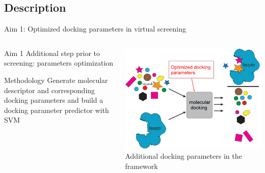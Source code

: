 \subsection{Description}
\begin{frame}{Aim 1: Optimized docking parameters in virtual screening}
   \begin{columns}
    \begin{column}{0.45\textwidth}
\begin{block}{Aim 1}
Additional step prior to screening: parameters optimization
\end{block}
\begin{block}{Methodology}
Generate molecular descriptor and corresponding docking parameters and build a docking parameter predictor with SVM
\end{block}
    \end{column}   

    \begin{column}{0.4\textwidth}
        \hfill
        \includegraphics[width=\textwidth]{../figures/vs2.png}\\
      {\hfill \scriptsize Additional docking parameters in the framework}
    \end{column}
    \end{columns}
\end{frame}

